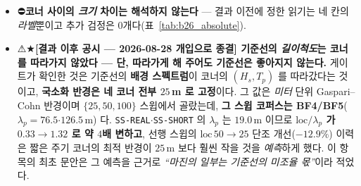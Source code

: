 \documentclass[11pt]{report}
\numberwithin{equation}{chapter}
\numberwithin{figure}{chapter}
\numberwithin{table}{chapter}
\begin{document}
\begin{itemize}
        \texttt{INADEQUATE} 가 아닌 앞의 $12$개를 취했다(거부는 전체에서 $1$건).
        이 규칙은 짧은 주기 코너에서 \emph{가장 어려운} 에피소드를 뺀다 ⟹ 만약 음성이
        나왔다면 그 음성은 과소평가된 것이었다. \textbf{양성이 나온 방향으로는 이 규칙이
        보수적이지 않다.}
  \item ⛔\textbf{코너 사이의 \emph{크기} 차이는 해석하지 않는다} --- 결과 이전에 정한 읽기는
        네 칸의 \emph{라벨}뿐이고 추가 검정은 $0$개다(표~\ref{tab:b26_absolute}).
  \item ⚠★\textbf{[결과 이후 공시 --- 2026-08-28 개입으로 종결] 기준선의 \emph{길이척도}는
        코너를 따라가지 않았다 --- 단, 따라가게 해 주어도 기준선은 좋아지지 않는다.}
        게이트가 확인한 것은 기준선의 \textbf{배경 스펙트럼}이 코너의 $(H_s, T_p)$ 를
        따라갔다는 것이고, \textbf{국소화 반경은 네 코너 전부 $25$\,m 로 고정}이다.
        그 값은 \emph{미터} 단위 Gaspari--Cohn 반경이며 $\{25, 50, 100\}$ 스윕에서
        골랐는데, \textbf{그 스윕 코퍼스는 BF4/BF5}($\lambda_p = 76.5$$\cdot$$126.5$\,m)
        다. \texttt{SS-REAL}$\cdot$\texttt{SS-SHORT} 의 $\lambda_p$ 는 $19.0$\,m 이므로
        \textbf{$\mathrm{loc}/\lambda_p$ 가 $0.33 \to 1.32$ 로 약 $4$배 변하고}, 선행
        스윕의 $\mathrm{loc}\,50 \to 25$ 단조 개선($-12.9\%$) 이력은 짧은 주기 코너의
        최적 반경이 $25$\,m 보다 훨씬 작을 것을 \emph{예측}하게 했다. 이 항목의 최초
        문안은 그 예측을 근거로 \emph{``마진의 일부는 기준선의 미조율 몫''}이라 적었다.


\end{itemize}
\end{document}
